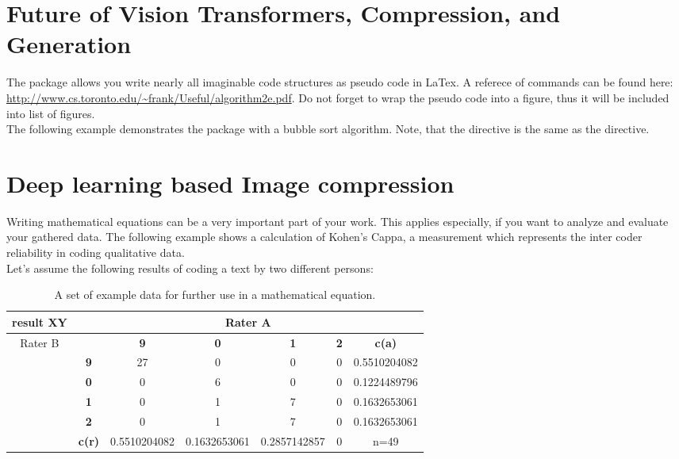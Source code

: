 \section{Future of Vision Transformers, Compression, and Generation}


The package  allows you write nearly all imaginable code structures as pseudo code in LaTex. A referece of commands can be found here: \url{http://www.cs.toronto.edu/~frank/Useful/algorithm2e.pdf}. Do not forget to wrap the pseudo code into a figure, thus it will be included into list of figures.\\

The following example demonstrates the package with a bubble sort algorithm. Note, that the directive  is the same as the  directive.


\newpage
\section{Deep learning based Image compression }

Writing mathematical equations can be a very important part of your work. This applies especially, if you want to analyze and evaluate your gathered data. The following example shows a calculation of Kohen's Cappa, a measurement which represents the inter coder reliability in coding qualitative data.\\

Let's assume the following results of coding a text by two different persons:

\begin{table}[H]
\begin{center}
\begin{tabular}{|c|c|c|c|c|c|c|}
\hline
result XY & \multicolumn{6}{c|}{Rater A}\\\hline
 \multirow{6}{*}{Rater B}& & \textbf{9} & \textbf{0} & \textbf{1} & \textbf{2} & \textbf{c(a) }\\\cline{2-7}
 & \textbf{9}& 27	&0&	0	&0 & 0.5510204082\\\cline{2-7}
&\textbf{0}	&0	&6	&0	&0&0.1224489796\\\cline{2-7}
&\textbf{1}	&0	&1	&7	&0&0.1632653061\\\cline{2-7}
&\textbf{2}	&0	&1	&7	&0&0.1632653061\\\cline{2-7}
&\textbf{c(r)} & 0.5510204082 & 0.1632653061 & 0.2857142857 & 0& n=49\\\hline

\end{tabular}
\caption[Example data for mathematical equations]{A set of example data for further use in a mathematical equation.  }
\end{center}
\end{table}

